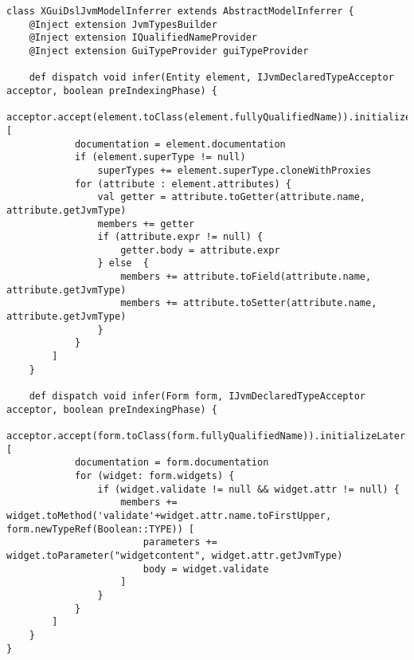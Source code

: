 
\begin{lstlisting}[language=xtend,float=tb,label=lst:xbase-jvm-inferrer,caption=JvmModelInferrer
written in Xtend.] 
class XGuiDslJvmModelInferrer extends AbstractModelInferrer {
	@Inject extension JvmTypesBuilder
	@Inject extension IQualifiedNameProvider
	@Inject extension GuiTypeProvider guiTypeProvider

	def dispatch void infer(Entity element, IJvmDeclaredTypeAcceptor acceptor, boolean preIndexingPhase) {
		acceptor.accept(element.toClass(element.fullyQualifiedName)).initializeLater [
			documentation = element.documentation
			if (element.superType != null)
				superTypes += element.superType.cloneWithProxies
			for (attribute : element.attributes) {
				val getter = attribute.toGetter(attribute.name, attribute.getJvmType)
				members += getter
				if (attribute.expr != null) {
					getter.body = attribute.expr
				} else  {
					members += attribute.toField(attribute.name, attribute.getJvmType)
					members += attribute.toSetter(attribute.name, attribute.getJvmType)
				}
			}
		]
	}

	def dispatch void infer(Form form, IJvmDeclaredTypeAcceptor acceptor, boolean preIndexingPhase) { 
		acceptor.accept(form.toClass(form.fullyQualifiedName)).initializeLater [
			documentation = form.documentation 
			for (widget: form.widgets) {
		    	if (widget.validate != null && widget.attr != null) {
		    		members += widget.toMethod('validate'+widget.attr.name.toFirstUpper, form.newTypeRef(Boolean::TYPE)) [
		    			parameters += widget.toParameter("widgetcontent", widget.attr.getJvmType)
		    			body = widget.validate
		    		]
		    	}
		    }   		 	
   		]
   	}
}
\end{lstlisting}

